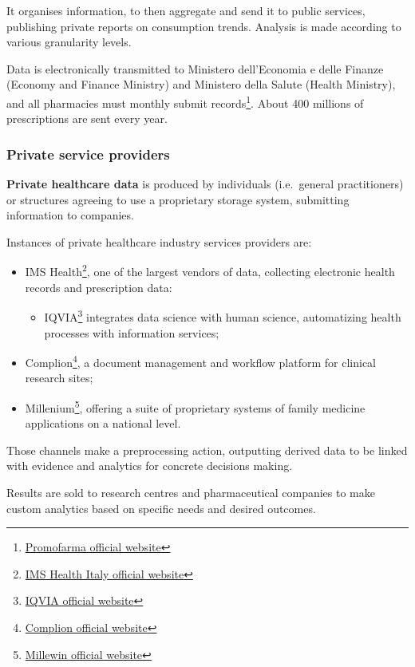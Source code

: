 It organises information, to then aggregate and send it to public services, publishing private reports on consumption trends. Analysis is made according to various granularity levels.

Data is electronically transmitted to Ministero dell'Economia e delle Finanze (Economy and Finance Ministry) and Ministero della Salute (Health Ministry), and all pharmacies must monthly submit records\footnote{\href{http://www.promofarma.it/Lista-pagine/Documentazione/Art-50.aspx}{Promofarma official website}}. About 400 millions of prescriptions are sent every year.

\subsubsection{Private service providers}
\textbf{Private healthcare data} is produced by individuals (i.e.\ general practitioners) or structures agreeing to use a proprietary storage system, submitting information to companies.

Instances of private healthcare industry services providers are:
\begin{itemize}
	\item IMS Health\footnote{\href{http://ecm-imshealth.it/}{IMS Health Italy official website}}, one of the largest vendors of data, collecting electronic health records and prescription data:
	\begin{itemize}
		\item IQVIA\footnote{\href{https://www.iqvia.com/}{IQVIA official website}} integrates data science with human science, automatizing health processes with information services;
	\end{itemize}
	\item Complion\footnote{\href{https://complion.com/}{Complion official website}}, a document management and workflow platform for clinical research sites;
	\item Millenium\footnote{\href{https://www.millewin.it/}{Millewin official website}}, offering a suite of proprietary systems of family medicine applications on a national level.
\end{itemize}

Those channels make a preprocessing action, outputting derived data to be linked with evidence and analytics for concrete decisions making.

Results are sold to research centres and pharmaceutical companies to make custom analytics based on specific needs and desired outcomes. 


